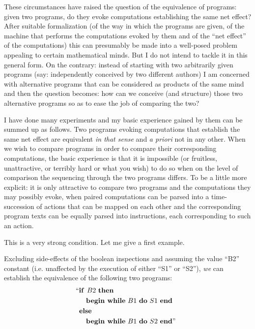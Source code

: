 These circumstances have raised the question of the equivalence of programs: given two programs, do they evoke computations establishing the same net effect? After suitable formalization (of the way in which the programs are given, of the machine that performs the computations evoked by them and of the ``net effect'' of the computations) this can presumably be made into a well-posed problem appealing to certain mathematical minds. But I do not intend to tackle it in this general form. On the contrary: instead of starting with two arbitrarily given programs (say: independently conceived by two different authors) I am concerned with alternative programs that can be considered as products of the same mind and then the question becomes: how can we conceive (and structure) those two alternative programs so as to ease the job of comparing the two?

I have done many experiments and my basic experience gained by them can be summed up as follows. Two programs evoking computations that establish the same net effect are equivalent \textit{in that sense} and \textit{a priori} not in any other. When we wish to compare programs in order to compare their corresponding computations, the basic experience is that it is impossible (or fruitless, unattractive, or terribly hard or what you wish) to do so when on the level of comparison the sequencing through the two programs differs. To be a little more explicit: it is only attractive to compare two programs and the computations they may possibly evoke, when paired computations can be parsed into a time-succession of actions that can be mapped on each other and the corresponding program texts can be equally parsed into instructions, each corresponding to such an action.

This is a very strong condition. Let me give a first example.

Excluding side-effects of the boolean inspections and assuming the value ``B2'' constant (i.e. unaffected by the execution of either ``S1'' or ``S2''), \textit{we} can establish the equivalence of the following two programs:
\begin{equation}
	\label{eq:comparing-example-1}
	\begin{split}
	&\text{\hspace{-.5em}``\textbf{if }} B2\text{ \textbf{then}}\\
	&\quad\text{\textbf{begin while} } B1\text{ \textbf{do} } S1 \text{ \textbf{end}}\\
	&\text{\textbf{else}}\\
	&\quad\text{\textbf{begin while} } B1\text{ \textbf{do} } S2\text{ \textbf{end}''}
	\end{split}
\end{equation}

